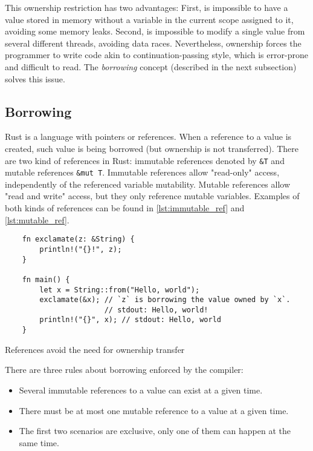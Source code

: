 This ownership restriction has two advantages: First, is impossible to have a value stored in memory without a variable in the current scope assigned to it, avoiding some memory leaks. Second, is impossible to modify a single value from several different threads, avoiding data races. Nevertheless, ownership forces the programmer to write code akin to continuation-passing style, which is error-prone and difficult to read. The \textit{borrowing} concept (described in the next subsection) solves this issue.

\subsection{Borrowing}
Rust is a language with pointers or references. When a reference to a value is created, such value is being borrowed (but ownership is not transferred). There are two kind of references in Rust: immutable references denoted by \texttt{&T} and mutable references \texttt{&mut T}. Immutable references allow "read-only" access, independently of the referenced variable mutability. Mutable references allow "read and write" access, but they only reference mutable variables. Examples of both kinds of references can be found in \ref{lst:immutable_ref} and \ref{lst:mutable_ref}.

\begin{listing}[h]
	\begin{verbatim}
    fn exclamate(z: &String) {
        println!("{}!", z);
    }

    fn main() {
        let x = String::from("Hello, world");
        exclamate(&x); // `z` is borrowing the value owned by `x`.
                       // stdout: Hello, world! 
        println!("{}", x); // stdout: Hello, world
    }
	\end{verbatim}
  \caption{References avoid the need for ownership transfer}
  \label{lst:immutable_ref}
\end{listing}

There are three rules about borrowing enforced by the compiler:
\begin{itemize}
    \item Several immutable references to a value can exist at a given time.
    \item There must be at most one mutable reference to a value at a given time.
    \item The first two scenarios are exclusive, only one of them can happen at the same time.
\end{itemize}


